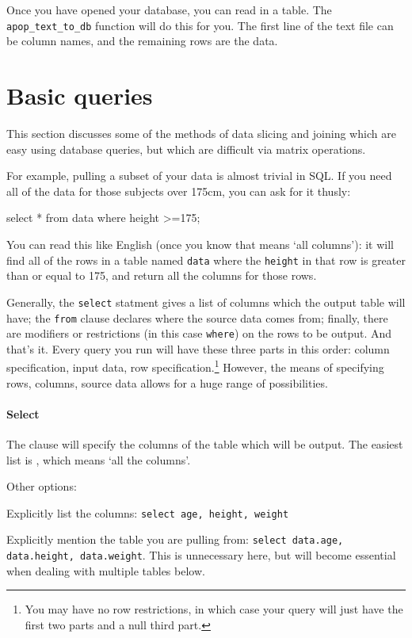 Once you have opened your database, you can read in a table. The {\tt
apop\_text\_to\_db} function will do this for you. The first line of the
text file can be column names, and the remaining rows are the data. 


\section{Basic queries}
This section discusses some of the methods of data slicing and joining
which are easy using database queries, but which are difficult via
matrix operations.

For example, pulling a subset of your data is almost trivial in SQL. If
you need all of the data for those subjects over 175cm, you can ask for
it thusly:

select * 
   from data 
   where height >=175;

You can read this like English (once you know that {\tt *} means `all
columns'): it will find all of the rows in a table named {\tt data}
where the {\tt height} in that row is greater than or equal to 175, and
return all the columns for those rows.


Generally, the {\tt select} statment gives a list of columns which the output
table will have; the {\tt from} clause declares where the source data
comes from; finally, there are modifiers or restrictions (in this case
{\tt where}) on the rows to be output.  And that's it. Every query
you run will have these three parts in this order: column specification, input data,
row specification.\footnote{You may have
no row restrictions, in which case your query will just have the first
two parts and a null third part.} However, the means of specifying rows, columns,
source data allows for a huge range of possibilities.

\paragraph{Select}
The  clause will specify the columns of the table which will
be output. The easiest list is {\tt *}, which means `all the columns'.

Other options:

Explicitly list the columns: {\tt select age, height, weight}

Explicitly mention the table you are pulling from: {\tt select data.age,
data.height, data.weight}. This is unnecessary here, but will become
essential when dealing with multiple tables below.

